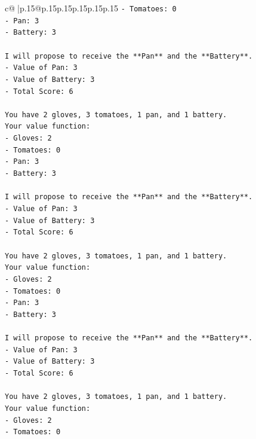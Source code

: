 \documentclass{article}
\begin{document}
{\begin{supertabular}{c@{$\;$}|p{.15\linewidth}@{}p{.15\linewidth}p{.15\linewidth}p{.15\linewidth}p{.15\linewidth}p{.15\linewidth}}
{{{\texttt{{-} Tomatoes: 0} \\
\texttt{{-} Pan: 3} \\
\texttt{{-} Battery: 3} \\
\\ 
\texttt{I will propose to receive the **Pan** and the **Battery**.} \\
\texttt{{-} Value of Pan: 3} \\
\texttt{{-} Value of Battery: 3} \\
\texttt{{-} Total Score: 6} \\
\\ 
\texttt{You have 2 gloves, 3 tomatoes, 1 pan, and 1 battery.} \\
\texttt{Your value function:} \\
\texttt{{-} Gloves: 2} \\
\texttt{{-} Tomatoes: 0} \\
\texttt{{-} Pan: 3} \\
\texttt{{-} Battery: 3} \\
\\ 
\texttt{I will propose to receive the **Pan** and the **Battery**.} \\
\texttt{{-} Value of Pan: 3} \\
\texttt{{-} Value of Battery: 3} \\
\texttt{{-} Total Score: 6} \\
\\ 
\texttt{You have 2 gloves, 3 tomatoes, 1 pan, and 1 battery.} \\
\texttt{Your value function:} \\
\texttt{{-} Gloves: 2} \\
\texttt{{-} Tomatoes: 0} \\
\texttt{{-} Pan: 3} \\
\texttt{{-} Battery: 3} \\
\\ 
\texttt{I will propose to receive the **Pan** and the **Battery**.} \\
\texttt{{-} Value of Pan: 3} \\
\texttt{{-} Value of Battery: 3} \\
\texttt{{-} Total Score: 6} \\
\\ 
\texttt{You have 2 gloves, 3 tomatoes, 1 pan, and 1 battery.} \\
\texttt{Your value function:} \\
\texttt{{-} Gloves: 2} \\
\texttt{{-} Tomatoes: 0} \\
}}}
\end{supertabular}}
\end{document}
